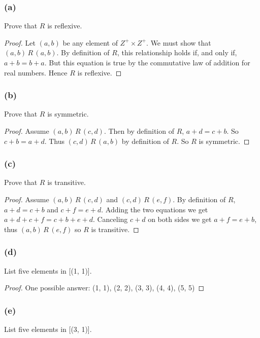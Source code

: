 \documentclass[14pt]{extarticle}
\begin{document}
\subsubsection{(a)}
Prove that $R$ is reflexive.

\begin{proof}
Let \((a, b)\) be any element of \(Z^+ \times Z^+\). We must show that \((a, b) \,R\, (a, b)\). By definition of 
$R$, this relationship holds if, and only if, \(a + b = b + a\). But this equation is true by the commutative law of 
addition for real numbers. Hence \(R\) is reflexive.
\end{proof}

\subsubsection{(b)}
Prove that $R$ is symmetric.

\begin{proof}
Assume \((a, b) \,R\, (c, d)\). Then by definition of $R$, \(a + d = c + b\). So \(c + b = a + d\). Thus 
\((c, d) \,R\, (a, b)\) by definition of $R$. So $R$ is symmetric.
\end{proof}

\subsubsection{(c)}
Prove that $R$ is transitive.

\begin{proof}
Assume \((a, b) \,R\, (c, d)\) and \((c, d)\,R\,(e, f)\). By definition of $R$, \(a + d=c + b\) and \(c + f=e + d\).
Adding the two equations we get \(a+d+c+f = c+b+e+d\). Canceling \(c+d\) on both sides we get \(a+f = e+b\), thus
\((a,b) \,R\, (e,f)\) so $R$ is transitive.
\end{proof}

\subsubsection{(d)}
List five elements in [(1, 1)].

\begin{proof}
One possible answer: (1, 1), (2, 2), (3, 3), (4, 4), (5, 5)
\end{proof}

\subsubsection{(e)}
List five elements in [(3, 1)].
\end{document}
